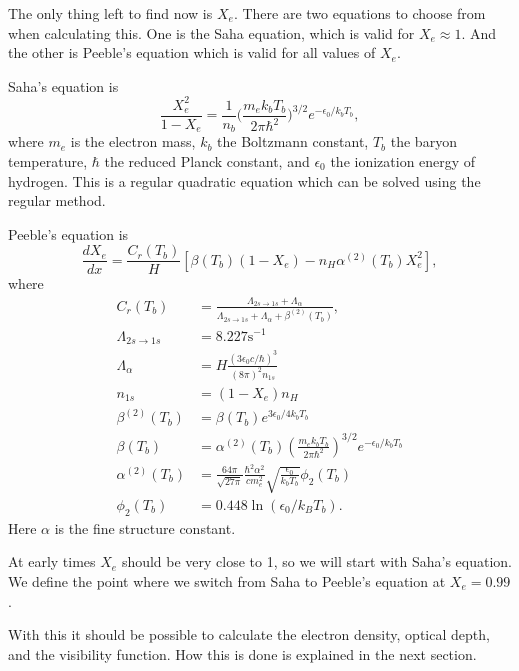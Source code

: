 \documentclass{aa}   %
\begin{document}
The only thing left to find now is $X_e$. There are two equations to choose from when calculating this.
One is the Saha equation, which is valid for $X_e \approx 1$. And the other is Peeble's equation which is valid for all values of $X_e$. 

Saha's equation is
\begin{equation}
 \frac{X_e^2}{1-X_e} = \frac{1}{n_b}\bigg(\frac{m_e k_b T_b}{2\pi \hbar^2}\bigg)^{3/2}e^{-\epsilon_0/k_b T_b},
\end{equation}
where $m_e$ is the electron mass, $k_b$ the Boltzmann constant, $T_b$ the baryon temperature, $\hbar$ the reduced Planck constant, and $\epsilon_0$ the ionization energy of hydrogen. This is a regular quadratic equation which can be solved using the regular method.

Peeble's equation is 
\begin{equation}
\frac{dX_e}{dx} = \frac{C_r(T_b)}{H} \left[\beta(T_b)(1-X_e) - n_H
  \alpha^{(2)}(T_b)X_e^2\right],
\end{equation}
where
\begin{align}
C_r(T_b) &= \frac{\Lambda_{2s\rightarrow1s} +	
  \Lambda_{\alpha}}{\Lambda_{2s\rightarrow1s} + \Lambda_{\alpha} +
  \beta^{(2)}(T_b)}, \\  
\Lambda_{2s\rightarrow1s} &= 8.227 \textrm{s}^{-1}\\
\Lambda_{\alpha} &= H\frac{(3\epsilon_0 c/\hbar)^3}{(8\pi)^2 n_{1s}}\\
n_{1s} &= (1-X_e)n_H \\
\beta^{(2)}(T_b) &= \beta(T_b) e^{3\epsilon_0/4k_b T_b} \\
\beta(T_b) &= \alpha^{(2)}(T_b) \left(\frac{m_e k_b T_b}{2\pi\hbar^2}
\right)^{3/2} e^{-\epsilon_0/k_b T_b} \\
\alpha^{(2)}(T_b) &= \frac{64\pi}{\sqrt{27\pi}}
\frac{\hbar^2 \alpha^2}{c m_e^2}\sqrt{\frac{\epsilon_0}{k_b T_b}}\phi_2(T_b)\\
\phi_2(T_b) &= 0.448\ln(\epsilon_0/k_B T_b).
\end{align}
Here $\alpha$ is the fine structure constant.

At early times $X_e$ should be very close to 1, so we will start with Saha's equation. We define the point where we switch from Saha to Peeble's equation at $X_e = 0.99$. 

With this it should be possible to calculate the electron density, optical depth, and the visibility function.
How this is done is explained in the next section.

\end{document}
